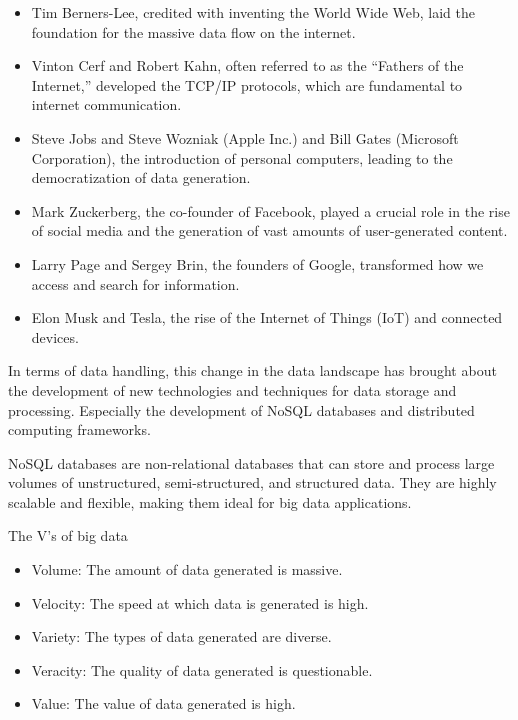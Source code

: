 \begin{itemize}
  \item Tim Berners-Lee, credited with inventing the World Wide Web, laid the foundation
    for the massive data flow on the internet.
  \item Vinton Cerf and Robert Kahn, often referred to as the ``Fathers of the Internet,''
    developed the TCP/IP protocols, which are fundamental to internet communication.
  \item Steve Jobs and Steve Wozniak (Apple Inc.) and Bill Gates (Microsoft Corporation),
    the introduction of personal computers, leading to the democratization of data
    generation.
  \item Mark Zuckerberg, the co-founder of Facebook, played a crucial role in the rise of
    social media and the generation of vast amounts of user-generated content.
  \item Larry Page and Sergey Brin, the founders of Google, transformed how we access and
    search for information.
  \item Elon Musk and Tesla, the rise of the Internet of Things (IoT) and connected
    devices.
\end{itemize}

In terms of data handling, this change in the data landscape has brought about the
development of new technologies and techniques for data storage and processing.  Especially
the development of NoSQL databases and distributed computing frameworks.

NoSQL databases are non-relational databases that can store and process large volumes of
unstructured, semi-structured, and structured data.  They are highly scalable and
flexible, making them ideal for big data applications.

\begin{mainbox}{The V's of big data}
  \begin{itemize}
    \item Volume: The amount of data generated is massive.
    \item Velocity: The speed at which data is generated is high.
    \item Variety: The types of data generated are diverse.
    \item Veracity: The quality of data generated is questionable.
    \item Value: The value of data generated is high.
  \end{itemize}
\end{mainbox}

